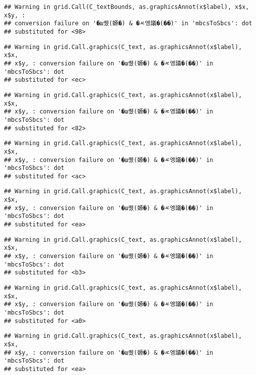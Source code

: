 \documentclass[
]{article}
\begin{document}
\begin{verbatim}
## Warning in grid.Call(C_textBounds, as.graphicsAnnot(x$label), x$x, x$y, :
## conversion failure on '�ш퀬(嫄�) & �ㅼ엥議�(��)' in 'mbcsToSbcs': dot
## substituted for <98>
\end{verbatim}

\begin{verbatim}
## Warning in grid.Call.graphics(C_text, as.graphicsAnnot(x$label), x$x,
## x$y, : conversion failure on '�ш퀬(嫄�) & �ㅼ엥議�(��)' in 'mbcsToSbcs': dot
## substituted for <ec>
\end{verbatim}

\begin{verbatim}
## Warning in grid.Call.graphics(C_text, as.graphicsAnnot(x$label), x$x,
## x$y, : conversion failure on '�ш퀬(嫄�) & �ㅼ엥議�(��)' in 'mbcsToSbcs': dot
## substituted for <82>
\end{verbatim}

\begin{verbatim}
## Warning in grid.Call.graphics(C_text, as.graphicsAnnot(x$label), x$x,
## x$y, : conversion failure on '�ш퀬(嫄�) & �ㅼ엥議�(��)' in 'mbcsToSbcs': dot
## substituted for <ac>
\end{verbatim}

\begin{verbatim}
## Warning in grid.Call.graphics(C_text, as.graphicsAnnot(x$label), x$x,
## x$y, : conversion failure on '�ш퀬(嫄�) & �ㅼ엥議�(��)' in 'mbcsToSbcs': dot
## substituted for <ea>
\end{verbatim}

\begin{verbatim}
## Warning in grid.Call.graphics(C_text, as.graphicsAnnot(x$label), x$x,
## x$y, : conversion failure on '�ш퀬(嫄�) & �ㅼ엥議�(��)' in 'mbcsToSbcs': dot
## substituted for <b3>
\end{verbatim}

\begin{verbatim}
## Warning in grid.Call.graphics(C_text, as.graphicsAnnot(x$label), x$x,
## x$y, : conversion failure on '�ш퀬(嫄�) & �ㅼ엥議�(��)' in 'mbcsToSbcs': dot
## substituted for <a0>
\end{verbatim}

\begin{verbatim}
## Warning in grid.Call.graphics(C_text, as.graphicsAnnot(x$label), x$x,
## x$y, : conversion failure on '�ш퀬(嫄�) & �ㅼ엥議�(��)' in 'mbcsToSbcs': dot
## substituted for <ea>
\end{verbatim}
\end{document}
